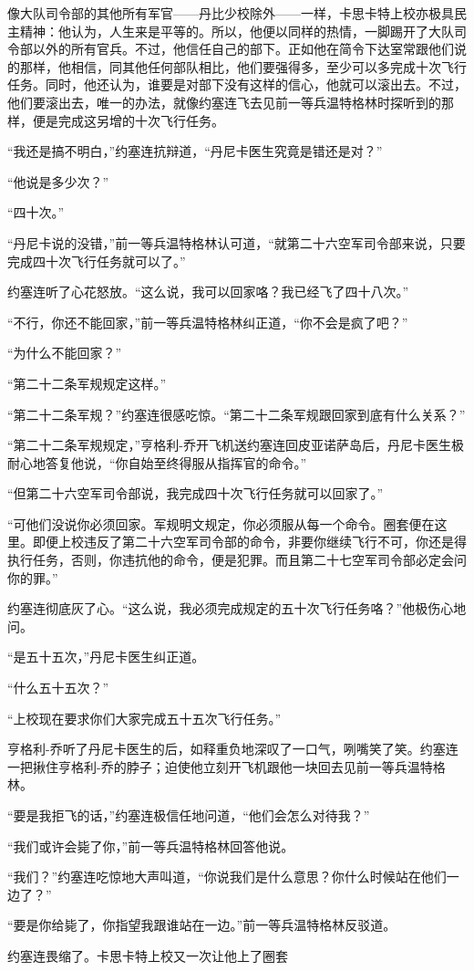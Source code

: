    像大队司令部的其他所有军官——丹比少校除外——一样，卡思卡特上校亦极具民主精神：他认为，人生来是平等的。所以，他便以同样的热情，一脚踢开了大队司令部以外的所有官兵。不过，他信任自己的部下。正如他在简令下达室常跟他们说的那样，他相信，同其他任何部队相比，他们要强得多，至少可以多完成十次飞行任务。同时，他还认为，谁要是对部下没有这样的信心，他就可以滚出去。不过，他们要滚出去，唯一的办法，就像约塞连飞去见前一等兵温特格林时探听到的那样，便是完成这另增的十次飞行任务。

    “我还是搞不明白，”约塞连抗辩道，“丹尼卡医生究竟是错还是对？”

    “他说是多少次？”

    “四十次。”

    “丹尼卡说的没错，”前一等兵温特格林认可道，“就第二十六空军司令部来说，只要完成四十次飞行任务就可以了。”

    约塞连听了心花怒放。“这么说，我可以回家咯？我已经飞了四十八次。”

    “不行，你还不能回家，”前一等兵温特格林纠正道，“你不会是疯了吧？”

    “为什么不能回家？”

    “第二十二条军规规定这样。”

    “第二十二条军规？”约塞连很感吃惊。“第二十二条军规跟回家到底有什么关系？”

    “第二十二条军规规定，”亨格利-乔开飞机送约塞连回皮亚诺萨岛后，丹尼卡医生极耐心地答复他说，“你自始至终得服从指挥官的命令。”

    “但第二十六空军司令部说，我完成四十次飞行任务就可以回家了。”

    “可他们没说你必须回家。军规明文规定，你必须服从每一个命令。圈套便在这里。即便上校违反了第二十六空军司令部的命令，非要你继续飞行不可，你还是得执行任务，否则，你违抗他的命令，便是犯罪。而且第二十七空军司令部必定会问你的罪。”

    约塞连彻底灰了心。“这么说，我必须完成规定的五十次飞行任务咯？”他极伤心地问。

    “是五十五次，”丹尼卡医生纠正道。

    “什么五十五次？”

    “上校现在要求你们大家完成五十五次飞行任务。”

    亨格利-乔听了丹尼卡医生的后，如释重负地深叹了一口气，咧嘴笑了笑。约塞连一把揪住亨格利-乔的脖子；迫使他立刻开飞机跟他一块回去见前一等兵温特格林。

    “要是我拒飞的话，”约塞连极信任地问道，“他们会怎么对待我？”

    “我们或许会毙了你，”前一等兵温特格林回答他说。

    “我们？”约塞连吃惊地大声叫道，“你说我们是什么意思？你什么时候站在他们一边了？”

    “要是你给毙了，你指望我跟谁站在一边。”前一等兵温特格林反驳道。

    约塞连畏缩了。卡思卡特上校又一次让他上了圈套

